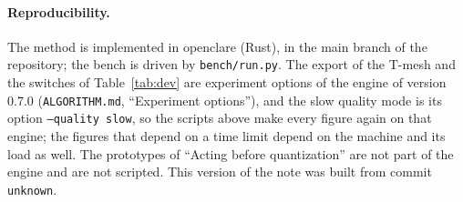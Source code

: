 \documentclass[11pt,a4paper]{article}
\providecommand{\enginecommit}{unknown}
\begin{document}
\paragraph{Reproducibility.} The method is implemented in openclare (Rust),
in the main branch of the repository; the bench is driven by
\texttt{bench/run.py}. The export of the T-mesh and the switches of
Table~\ref{tab:dev} are experiment options of the engine of version 0.7.0
(\texttt{ALGORITHM.md}, ``Experiment options''), and the slow quality mode
is its option \texttt{--quality slow}, so the scripts above make every
figure again on that engine; the figures that
depend on a time limit depend on the machine and its load as well. The
prototypes of ``Acting before quantization'' are not part of the engine and
are not scripted. This version of the note was built from commit
\texttt{\enginecommit}.
\end{document}
